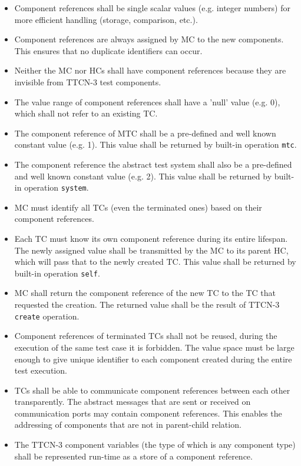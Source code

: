 \documentclass[a4paper,10pt]{article}
\begin{document}
\begin{itemize}

\item Component references shall be single scalar values (e.g. integer numbers) for more efficient handling (storage, comparison, etc.).

\item Component references are always assigned by MC to the new components. This ensures that no duplicate identifiers can occur.

\item Neither the MC nor HCs shall have component references because they are invisible from TTCN-3 test components.

\item The value range of component references shall have a 'null' value (e.g. 0), which shall not refer to an existing TC.

\item The component reference of MTC shall be a pre-defined and well known constant value (e.g. 1). This value shall be returned by built-in operation {\tt mtc}.

\item The component reference the abstract test system shall also be a pre-defined and well known constant value (e.g. 2). This value shall be returned by built-in operation {\tt system}.

\item MC must identify all TCs (even the terminated ones) based on their component references.

\item Each TC must know its own component reference during its entire lifespan. The newly assigned value shall be transmitted by the MC to its parent HC, which will pass that to the newly created TC. This value shall be returned by built-in operation {\tt self}.

\item MC shall return the component reference of the new TC to the TC that requested the creation. The returned value shall be the result of TTCN-3 {\tt create} operation.

\item Component references of terminated TCs shall not be reused, during the execution of the same test case it is forbidden. The value space must be large enough to give unique identifier to each component created during the entire test execution.

\item TCs shall be able to communicate component references between each other transparently. The abstract messages that are sent or received on communication ports may contain component references. This enables the addressing of components that are not in parent-child relation.

\item The TTCN-3 component variables (the type of which is any component type) shall be represented run-time as a store of a component reference.

\end{itemize}
\end{document}
